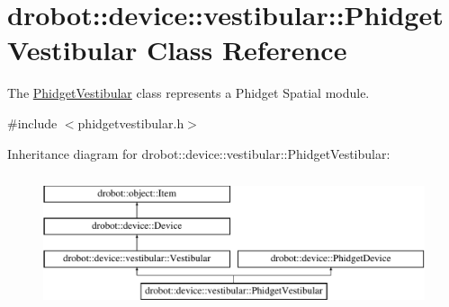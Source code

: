 \hypertarget{classdrobot_1_1device_1_1vestibular_1_1PhidgetVestibular}{\section{drobot\-:\-:device\-:\-:vestibular\-:\-:Phidget\-Vestibular Class Reference}
\label{classdrobot_1_1device_1_1vestibular_1_1PhidgetVestibular}
}


The \hyperlink{classdrobot_1_1device_1_1vestibular_1_1PhidgetVestibular}{Phidget\-Vestibular} class represents a Phidget Spatial module.  




{\ttfamily \#include $<$phidgetvestibular.\-h$>$}

Inheritance diagram for drobot\-:\-:device\-:\-:vestibular\-:\-:Phidget\-Vestibular\-:\begin{figure}[H]
\begin{center}
\leavevmode
\includegraphics[height=4.000000cm]{classdrobot_1_1device_1_1vestibular_1_1PhidgetVestibular}
\end{center}
\end{figure}
